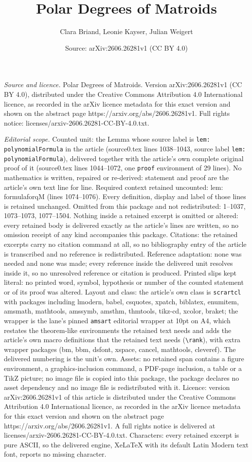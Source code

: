 \documentclass[10pt,a4paper]{amsart}
\title[Polar Degrees of Matroids]{Polar Degrees of Matroids}
\author{Clara Briand, Leonie Kayser, Julian Weigert}
\date{Source: arXiv:2606.26281v1 (CC BY 4.0)}
\begin{document}
\maketitle

\noindent\emph{Source and licence.} Polar Degrees of Matroids. Version arXiv:2606.26281v1 (CC BY 4.0), distributed under the Creative Commons Attribution 4.0 International licence, as recorded in the arXiv licence metadata for this exact version and shown on the abstract page https://arxiv.org/abs/2606.26281v1. Full rights notice: licenses/arxiv-2606.26281-CC-BY-4.0.txt.\par\smallskip

\noindent\textit{Editorial scope.} Counted unit: the Lemma whose source label is \texttt{lem: polynomialFormula} in the article (source0.tex lines 1038--1043, source label \texttt{lem: polynomialFormula}), delivered together with the article's own complete original proof of it (source0.tex lines 1044--1072, one \texttt{proof} environment of 29 lines). No mathematics is written, repaired or re-derived: statement and proof are the article's own text line for line. Required context retained uncounted: lem: formulaforqM (lines 1074--1076). Every definition, display and label of those lines is retained unchanged. Omitted from this package and not redistributed: 1--1037, 1073--1073, 1077--1504. Nothing inside a retained excerpt is omitted or altered: every retained body is delivered exactly as the article's lines are written, so no omission receipt of any kind accompanies this package. Citations: the retained excerpts carry no citation command at all, so no bibliography entry of the article is transcribed and no reference is redistributed. Reference adaptation: none was needed and none was made; every reference inside the delivered unit resolves inside it, so no unresolved reference or citation is produced. Printed slips kept literal: no printed word, symbol, hypothesis or number of the counted statement or of its proof was altered. Layout and class: the article's own class is \texttt{scrartcl} with packages including lmodern, babel, csquotes, xpatch, biblatex, enumitem, amsmath, mathtools, amssymb, amsthm, thmtools, tikz-cd, xcolor, braket; the wrapper is the lane's pinned \texttt{amsart} editorial wrapper at 10pt on A4, which restates the theorem-like environments the retained text needs and adds the article's own macro definitions that the retained text needs (\texttt{\textbackslash rank}), with extra wrapper packages (bm, bbm, dsfont, xspace, cancel, mathtools, cleveref). The delivered numbering is the unit's own. Assets: no retained span contains a figure environment, a graphics-inclusion command, a PDF-page inclusion, a table or a TikZ picture; no image file is copied into this package, the package declares no asset dependency and no image file is redistributed with it. Licence: version arXiv:2606.26281v1 of this article is distributed under the Creative Commons Attribution 4.0 International licence, as recorded in the arXiv licence metadata for this exact version and shown on the abstract page https://arxiv.org/abs/2606.26281v1. A full rights notice is delivered at licenses/arxiv-2606.26281-CC-BY-4.0.txt. Characters: every retained excerpt is pure ASCII, so the delivered engine, XeLaTeX with its default Latin Modern text font, reports no missing character.
\end{document}
